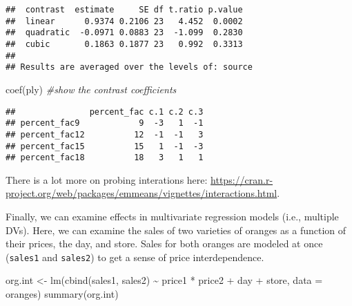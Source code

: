 \documentclass[
]{book}
\newenvironment{Shaded}{\begin{snugshade}}{\end{snugshade}}
\newcommand{\AttributeTok}[1]{\textcolor[rgb]{0.77,0.63,0.00}{#1}}
\newcommand{\CommentTok}[1]{\textcolor[rgb]{0.56,0.35,0.01}{\textit{#1}}}
\newcommand{\FunctionTok}[1]{\textcolor[rgb]{0.00,0.00,0.00}{#1}}
\newcommand{\NormalTok}[1]{#1}
\newcommand{\OtherTok}[1]{\textcolor[rgb]{0.56,0.35,0.01}{#1}}
\newcommand{\SpecialCharTok}[1]{\textcolor[rgb]{0.00,0.00,0.00}{#1}}
\begin{document}
\begin{verbatim}
##  contrast  estimate     SE df t.ratio p.value
##  linear      0.9374 0.2106 23   4.452  0.0002
##  quadratic  -0.0971 0.0883 23  -1.099  0.2830
##  cubic       0.1863 0.1877 23   0.992  0.3313
## 
## Results are averaged over the levels of: source
\end{verbatim}

\begin{Shaded}
\begin{Highlighting}[]
\FunctionTok{coef}\NormalTok{(ply) }\CommentTok{\#show the contrast coefficients}
\end{Highlighting}
\end{Shaded}

\begin{verbatim}
##               percent_fac c.1 c.2 c.3
## percent_fac9            9  -3   1  -1
## percent_fac12          12  -1  -1   3
## percent_fac15          15   1  -1  -3
## percent_fac18          18   3   1   1
\end{verbatim}

There is a lot more on probing interations here: \url{https://cran.r-project.org/web/packages/emmeans/vignettes/interactions.html}.

Finally, we can examine effects in multivariate regression models (i.e., multiple DVs). Here, we can examine the sales of two varieties of oranges as a function of their prices, the day, and store. Sales for both oranges are modeled at once (\texttt{sales1} and \texttt{sales2}) to get a sense of price interdependence.

\begin{Shaded}
\begin{Highlighting}[]
\NormalTok{org.int }\OtherTok{\textless{}{-}} \FunctionTok{lm}\NormalTok{(}\FunctionTok{cbind}\NormalTok{(sales1, sales2) }\SpecialCharTok{\textasciitilde{}}\NormalTok{ price1 }\SpecialCharTok{*}\NormalTok{ price2 }\SpecialCharTok{+}\NormalTok{ day }\SpecialCharTok{+}\NormalTok{ store, }\AttributeTok{data =}\NormalTok{ oranges)}
\FunctionTok{summary}\NormalTok{(org.int)}
\end{Highlighting}
\end{Shaded}
\end{document}
